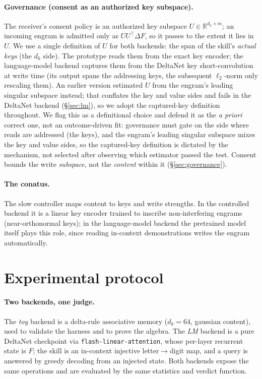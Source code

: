 \documentclass[11pt]{article}
\theoremstyle{definition}
\newcommand{\R}{\mathbb{R}}
\newcommand{\F}{F}
\newcommand{\dk}{d_k}
\begin{document}
\paragraph{Governance (consent as an authorized key subspace).}
The receiver's consent policy is an authorized key subspace $U\in\R^{\dk\times m}$; an incoming engram is admitted only as $U U^\top\Delta\F$, so it passes to the extent it lies in $U$. We use a single definition of $U$ for both backends: the span of the skill's \emph{actual keys} (the $\dk$ side). The prototype reads them from the exact key encoder; the language-model backend captures them from the DeltaNet key short-convolution at write time (its output spans the addressing keys, the subsequent $\ell_2$-norm only rescaling them). An earlier version estimated $U$ from the engram's leading singular subspace instead; that conflates the key and value sides and fails in the DeltaNet backend (\S\ref{sec:lm}), so we adopt the captured-key definition throughout. We flag this as a definitional choice and defend it as the \emph{a priori} correct one, not an outcome-driven fit: governance must gate on the side where reads are addressed (the keys), and the engram's leading singular subspace mixes the key and value sides, so the captured-key definition is dictated by the mechanism, not selected after observing which estimator passed the test. Consent bounds the write \emph{subspace}, not the \emph{content} within it (\S\ref{sec:governance}).

\paragraph{The conatus.}
The slow controller maps content to keys and write strengths. In the controlled backend it is a linear key encoder trained to inscribe non-interfering engrams (near-orthonormal keys); in the language-model backend the pretrained model itself plays this role, since reading in-context demonstrations writes the engram automatically.

\section{Experimental protocol}
\label{sec:protocol}

\paragraph{Two backends, one judge.}
The \emph{toy} backend is a delta-rule associative memory ($\dk=64$, gaussian content), used to validate the harness and to prove the algebra. The \emph{LM} backend is a pure DeltaNet checkpoint via \texttt{flash-linear-attention}, whose per-layer recurrent state is $\F$; the skill is an in-context injective letter$\to$digit map, and a query is answered by greedy decoding from an injected state. Both backends expose the same operations and are evaluated by the same statistics and verdict function.
\end{document}
